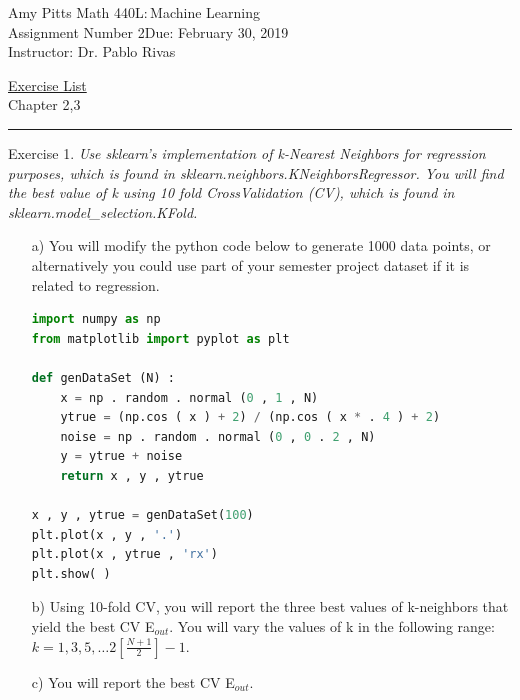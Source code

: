 \documentclass[12pt]{article}
\newcommand{\myname}{Amy Pitts} %
\newcommand{\duedate}{February 30, 2019} %
\newcommand{\courseno}{440L}      %
\newcommand{\coursename}{Machine Learning}    %
\newcommand{\instructorname}{Instructor: Dr. Pablo Rivas} %
\newcommand{\assignumber}{2}   %
\newcommand{\exerciselist}{Chapter 2,3}      %
\newcommand{\firstpageinfo}  
    {\textsf{\large\myname}    \hfill     Math \courseno{:}\,\coursename \\
  Assignment Number \assignumber \hfill  Due:  \duedate \\
  \instructorname}
\newenvironment{exercise}[1][]{%
  \bigskip                          %
  \noindent \textsf{Exercise #1.}\slshape }{}
\begin{document}
\thispagestyle{empty}

\noindent\firstpageinfo
\begin{center} \underline{\textsf{Exercise List}}\\[5pt] \exerciselist \end{center}
\medskip\hrule


\begin{exercise}[1] %
  Use sklearn's implementation of k-Nearest Neighbors for 
  regression purposes,  which is found in sklearn.neighbors.KNeighborsRegressor.
  You will find the best value of k using 10 fold CrossValidation 
  (CV), which is found in sklearn.model\_selection.KFold.
  \begin{enumerate}
    \item[a)]  You will modify the python code below to generate 1000 data points, or alternatively you could
    use part of your semester project dataset if it is related to regression.
  \lstset{language=Python,frame=single}
  \begin{lstlisting}[language=Python,frame=single]
import numpy as np
from matplotlib import pyplot as plt

def genDataSet (N) :
    x = np . random . normal (0 , 1 , N)
    ytrue = (np.cos ( x ) + 2) / (np.cos ( x * . 4 ) + 2)
    noise = np . random . normal (0 , 0 . 2 , N)
    y = ytrue + noise
    return x , y , ytrue

x , y , ytrue = genDataSet(100)
plt.plot(x , y , '.')
plt.plot(x , ytrue , 'rx')
plt.show( )
  \end{lstlisting}
  \item[b)]Using 10-fold CV, you will report the three best values of k-neighbors that yield the best CV
  E$_{out}$. You will vary the values of k in the following range: $k = 1 ,3,5,\dots 2[\frac{N+1}{2}]-1$.
  \item[c)] You will report the best CV E$_{out}$. 
  \end{enumerate}
\end{exercise}
  
\end{document}
